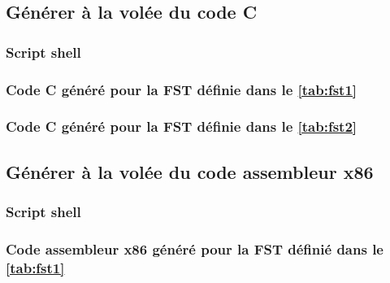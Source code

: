 \subsection{Générer à la volée du code C}
\label{sec:annexe:shell:c}
\subsubsection{Script shell}



\clearpage
\subsubsection{Code C généré pour la FST définie dans le \autoref{tab:fst1}}



\clearpage
\subsubsection{Code C généré pour la FST définie dans le \autoref{tab:fst2}}




\clearpage
\subsection{Générer à la volée du code assembleur x86}
\label{sec:annexe:shell:asm}
\subsubsection{Script shell}



\clearpage
\subsubsection{Code assembleur x86 généré pour la FST définié dans le \autoref{tab:fst1}}



